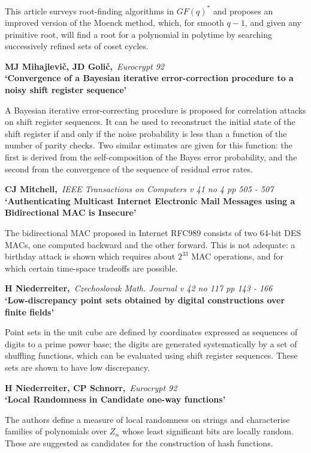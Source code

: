 This article surveys root-finding algorithms in $GF(q)^*$ and proposes an
improved version of the Moenck method, which, for smooth $q-1$, and given
any primitive root, will find a root for a polynomial in polytime by
searching successively refined sets of coset cycles.

{\bf \noindent MJ Mihajlevi\v{c}, JD Goli\v{c},}{\em ~Eurocrypt 92\\}
{\bf `Convergence of a Bayesian iterative error-correction procedure to a 
noisy shift register sequence'}

A Bayesian iterative error-correcting procedure is proposed for correlation
attacks on shift register sequences. It can be used to reconstruct
the initial state of the shift register if and only if the noise probability 
is less than a function of the number of parity checks. Two similar
estimates are given for this function: the first is derived from the 
self-composition of the Bayes error probability, and the second from the 
convergence of the sequence of residual error rates.

{\bf \noindent CJ Mitchell,}{\em ~IEEE Transactions on Computers v 41 no 4
pp 505 - 507\\}
{\bf `Authenticating Multicast Internet Electronic Mail Messages using a 
Bidirectional MAC is Insecure'}

The bidirectional MAC proposed in Internet RFC989 consists of two 64-bit DES
MACs, one computed backward and the other forward. This is not adequate: a
birthday attack is shown which requires about $2^{33}$ MAC operations, and 
for which certain time-space tradeoffs are possible.

{\bf \noindent H Niederreiter,}{\em ~Czechoslovak Math. Journal v 42 no 117 
pp 143 - 166\\}
{\bf `Low-discrepancy point sets obtained by digital constructions over
finite fields'}

Point sets in the unit cube are defined by coordinates expressed as sequences
of digits to a prime power base; the digits are generated systematically by a
set of shuffling functions, which can be evaluated using shift register
sequences. These sets are shown to have low discrepancy.

{\bf \noindent H Niederreiter, CP Schnorr,}{\em ~Eurocrypt 92\\}
{\bf `Local Randomness in Candidate one-way functions'}

The authors define a measure of local randomness on strings and characterise
families of polynomials over $Z_n$ whose least significant bits are locally
random. These are suggested as candidates for the construction of hash 
functions.

